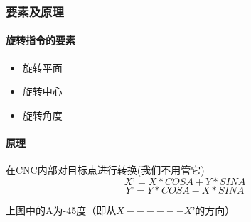 \subsubsection{要素及原理}
\paragraph{旋转指令的要素}
\begin{itemize}
\item 旋转平面
\item 旋转中心
\item 旋转角度
\end{itemize}
\paragraph{原理}
在CNC内部对目标点进行转换(我们不用管它)
$$X’=X*COSA+Y*SINA$$
$$Y’=Y*COSA-X*SINA$$

上图中的A为-45度（即从$X------X’$的方向）
